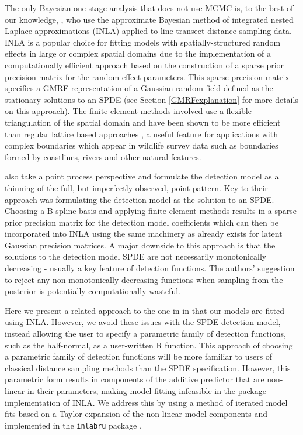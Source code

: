 \documentclass[preprint,12pt]{elsarticle}
\begin{document}
The only Bayesian one-stage analysis that does not use MCMC is, to the best of our knowledge, \citet{yuan_point_2017}, who use the approximate Bayesian method of integrated nested Laplace approximations (INLA) \citep{rue_approximate_2009} applied to line transect distance sampling data.  INLA is a popular choice for fitting models with spatially-structured random effects in large or complex spatial domains due to the implementation of a computationally efficient approach based on the construction of a sparse prior precision matrix for the random effect parameters.  This sparse precision matrix specifies a GMRF representation of a Gaussian random field defined as the stationary solutions to an SPDE \citep{lindgren_explicit_2011} (see Section \ref{GMRFexplanation} for more details on this approach).  The finite element methods involved use a flexible triangulation of the spatial domain and have been shown to be more efficient than regular lattice based approaches \citep{simpson_going_2016}, a useful feature for applications with complex boundaries which appear in wildlife survey data such as boundaries formed by coastlines, rivers and other natural features. 

\citet{yuan_point_2017} also take a point process perspective and formulate the detection model as a thinning of the full, but imperfectly observed, point pattern.  Key to their approach was formulating the detection model as the solution to an SPDE.  Choosing a B-spline basis and applying finite element methods results in a sparse prior precision matrix for the detection model coefficients which can then be incorporated into INLA using the same machinery as already exists for latent Gaussian precision matrices.  A major downside to this approach is that the solutions to the detection model SPDE are not necessarily monotonically decreasing - usually a key feature of detection functions.  The authors' suggestion to reject any non-monotonically decreasing functions when sampling from the posterior is potentially computationally wasteful. 

Here we present a related approach to the one in \citet{yuan_point_2017} in that our models are fitted using INLA.  However, we avoid these issues with the SPDE detection model, instead allowing the user to specify a parametric family of detection functions, such as the half-normal, as a user-written R function.  This approach of choosing a parametric family of detection functions will be more familiar to users of classical distance sampling methods than the SPDE specification.  However, this parametric form results in components of the additive predictor that are non-linear in their parameters, making model fitting infeasible in the  \citep{rue_approximate_2009} package implementation of INLA.  We address this by using a method of iterated model fits based on a Taylor expansion of the non-linear model components and implemented in the \texttt{inlabru} package \citep{bachl_inlabru_2019}.
\end{document}
